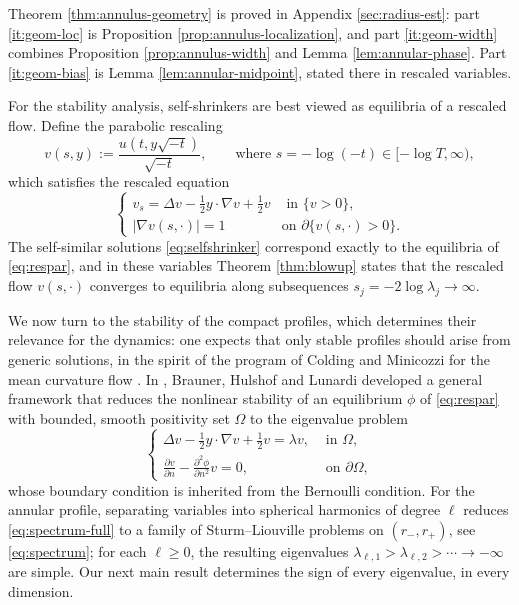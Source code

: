 \documentclass[11pt]{article}
\numberwithin{equation}{section}
\theoremstyle{definition}
\begin{document}
Theorem \ref{thm:annulus-geometry} is proved in Appendix \ref{sec:radius-est}: part \ref{it:geom-loc} is Proposition \ref{prop:annulus-localization}, and part \ref{it:geom-width} combines Proposition \ref{prop:annulus-width} and Lemma \ref{lem:annular-phase}. Part \ref{it:geom-bias} is Lemma \ref{lem:annular-midpoint}, stated there in rescaled variables.
\medskip

For the stability analysis, self-shrinkers are best viewed as equilibria of a rescaled flow. Define the parabolic rescaling
\begin{equation}\label{def:prescaling}
	v(s,y) := \frac{u(t, y\sqrt{-t})}{\sqrt{-t}}, \qquad \text{where } s=-\log(-t) \in [-\log T,\infty),
\end{equation}
which satisfies the rescaled equation
\begin{equation}\label{eq:respar}
    \left\{\begin{array}{ll}
        v_s = \Delta v -\frac12 y\cdot \nabla v + \frac12 v & \text{ in } \{ v>0\}, \\
        |\nabla v(s, \cdot)| = 1 & \text{on } \partial\{v(s, \cdot)>0\}.
    \end{array} \right.\tag{E}
\end{equation}
The self-similar solutions \eqref{eq:selfshrinker} correspond exactly to the equilibria of \eqref{eq:respar}, and in these variables Theorem \ref{thm:blowup} states that the rescaled flow $v(s,\cdot)$ converges to equilibria along subsequences $s_j=-2\log\lambda_j\to\infty$.

We now turn to the stability of the compact profiles, which determines their relevance for the dynamics: one expects that only stable profiles should arise from generic solutions, in the spirit of the program of Colding and Minicozzi for the mean curvature flow \cite{CM-stable}. In \cite{stability}, Brauner, Hulshof and Lunardi developed a general framework that reduces the nonlinear stability of an equilibrium $\phi$ of \eqref{eq:respar} with bounded, smooth positivity set $\Omega$ to the eigenvalue problem
\begin{equation}\label{eq:spectrum-full}
    \left\{\begin{array}{ll}
       \Delta v - \frac{1}{2} y \cdot \nabla v + \frac{1}{2} v = \lambda v,  & \text{ in } \Omega,  \\[5pt]
       \frac{\partial v}{\partial n} -
    	\frac{\partial^2 \phi}{\partial n^2} v = 0,  & \text{ on } \partial \Omega,
    \end{array} \right.
\end{equation}
whose boundary condition is inherited from the Bernoulli condition. For the annular profile, separating variables into spherical harmonics of degree $\ell$ reduces \eqref{eq:spectrum-full} to a family of Sturm--Liouville problems on $(r_-,r_+)$, see \eqref{eq:spectrum}; for each $\ell\geq0$, the resulting eigenvalues $\lambda_{\ell,1}>\lambda_{\ell,2}>\cdots\to-\infty$ are simple. Our next main result determines the sign of every eigenvalue, in every dimension.
\end{document}
